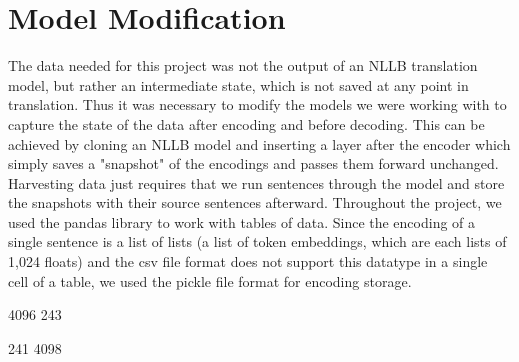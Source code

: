 \section{Model Modification}

The data needed for this project was not the output of an NLLB translation model, but rather an intermediate state, which is not saved at any point in translation. Thus it was necessary to modify the models we were working with to capture the state of the data after encoding and before decoding. This can be achieved by cloning an NLLB model and inserting a layer after the encoder which simply saves a "snapshot" of the encodings and passes them forward unchanged. Harvesting data just requires that we run sentences through the model and store the snapshots with their source sentences afterward. Throughout the project, we used the pandas library to work with tables of data. Since the encoding of a single sentence is a list of lists (a list of token embeddings, which are each lists of 1,024 floats) and the csv file format does not support this datatype in a single cell of a table, we used the pickle file format for encoding storage.

4096 %
243 %


241 %
4098 %










